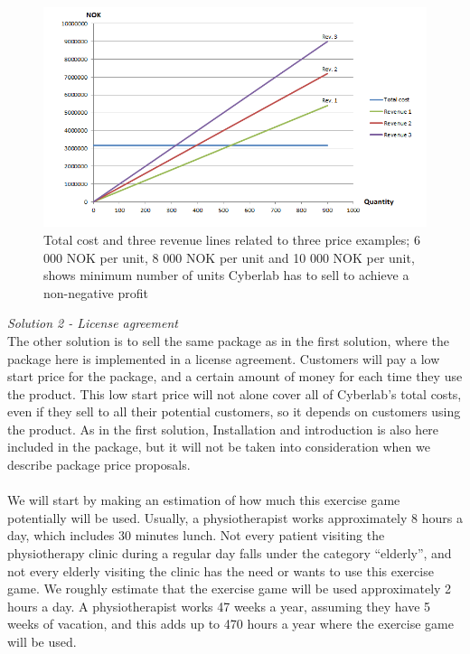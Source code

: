 \begin{figure}
\label{fig:RevenueStreamQuantity}
\begin{center}
\includegraphics[scale=0.7]{revenuestreamquantity}
\caption[Quantity examples]{Total cost and three revenue lines related to three price examples; 6 000 NOK per unit, 8 000 NOK per unit and 10 000 NOK per unit, shows minimum number of units Cyberlab has to sell to achieve a non-negative profit}
\end{center}
\end{figure}
\emph{Solution 2 - License agreement}\\
The other solution is to sell the same package as in the first solution, where the package here is implemented in a license agreement. Customers will pay a low start price for the package, and a certain amount of money for each time they use the product. This low start price will not alone cover all of Cyberlab’s total costs, even if they sell to all their potential customers, so it depends on customers using the product. As in the first solution, Installation and introduction is also here included in the package, but it will not be taken into consideration when we describe package price proposals. \\ \\
We will start by making an estimation of how much this exercise game potentially will be used. Usually, a physiotherapist works approximately 8 hours a day, which includes 30 minutes lunch. Not every patient visiting the physiotherapy clinic during a regular day falls under the category “elderly”, and not every elderly visiting the clinic has the need or wants to use this exercise game. We roughly estimate that the exercise game will be used approximately 2 hours a day. A physiotherapist works 47 weeks a year, assuming they have 5 weeks of vacation, and this adds up to 470 hours a year where the exercise game will be used.\\ \\
